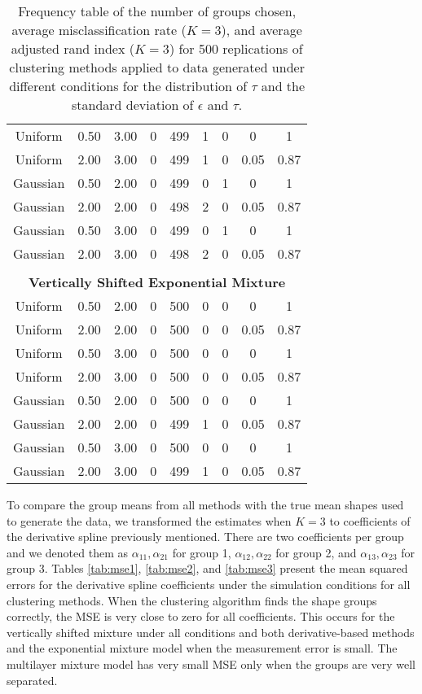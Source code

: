 \begin{table}[ht]
\begin{center}
\begin{tabular}{ccc|cccccc}
  Uniform & 0.50 & 3.00 & 0 & 499 & 1 & 0 & 0 & 1 \\ 
  Uniform & 2.00 & 3.00 & 0 & 499 & 1 & 0 & 0.05 & 0.87 \\ 
  Gaussian & 0.50 & 2.00 & 0 & 499 & 0 & 1 & 0 & 1 \\ 
  Gaussian & 2.00 & 2.00 & 0 & 498 & 2 & 0 & 0.05 & 0.87 \\ 
  Gaussian & 0.50 & 3.00 & 0 & 499 & 0 & 1 & 0 & 1 \\ 
  Gaussian & 2.00 & 3.00 & 0 & 498 & 2 & 0 & 0.05 & 0.87 \\ 
   \\ \multicolumn{9}{c}{\textbf{Vertically Shifted Exponential Mixture}}\\Uniform & 0.50 & 2.00 & 0 & 500 & 0 & 0 & 0 & 1 \\ 
  Uniform & 2.00 & 2.00 & 0 & 500 & 0 & 0 & 0.05 & 0.87 \\ 
  Uniform & 0.50 & 3.00 & 0 & 500 & 0 & 0 & 0 & 1 \\ 
  Uniform & 2.00 & 3.00 & 0 & 500 & 0 & 0 & 0.05 & 0.87 \\ 
  Gaussian & 0.50 & 2.00 & 0 & 500 & 0 & 0 & 0 & 1 \\ 
  Gaussian & 2.00 & 2.00 & 0 & 499 & 1 & 0 & 0.05 & 0.87 \\ 
  Gaussian & 0.50 & 3.00 & 0 & 500 & 0 & 0 & 0 & 1 \\ 
  Gaussian & 2.00 & 3.00 & 0 & 499 & 1 & 0 & 0.05 & 0.87 \\ 
   \hline\end{tabular}
\caption{Frequency table of the number of groups chosen, average misclassification rate ($K=3$), and average adjusted rand index ($K=3$) for 500 replications of clustering methods applied to data generated under different conditions for the distribution of $\tau$ and the standard deviation of $\epsilon$ and $\tau$.}
\label{tab:freq3}
\end{center}
\end{table}

To compare the group means from all methods with the true mean shapes used to generate the data, we transformed the estimates when $K=3$ to coefficients of the derivative spline previously mentioned. There are two coefficients per group and we denoted them as $\alpha_{11},\alpha_{21}$ for group 1, $\alpha_{12},\alpha_{22}$ for group 2, and $\alpha_{13},\alpha_{23}$ for group 3. Tables \ref{tab:mse1}, \ref{tab:mse2}, and \ref{tab:mse3} present the mean squared errors for the derivative spline coefficients under the simulation conditions for all clustering methods. When the clustering algorithm finds the shape groups correctly, the MSE is very close to zero for all coefficients. This occurs for the vertically shifted mixture under all conditions and both derivative-based methods and the exponential mixture model when the measurement error is small. The multilayer mixture model has very small MSE only when the groups are very well separated.\\

